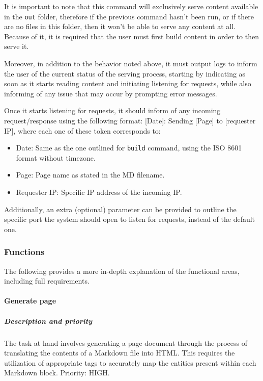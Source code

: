 It is important to note that this command will exclusively serve content
available in the \texttt{out} folder, therefore if the previous command
hasn't been run, or if there are no files in this folder, then it won't
be able to serve any content at all. Because of it, it is required that
the user must first build content in order to then serve it.

Moreover, in addition to the behavior noted above, it must output logs
to inform the user of the current status of the serving process,
starting by indicating as soon as it starts reading content and
initiating listening for requests, while also informing of any issue
that may occur by prompting error messages.

Once it starts listening for requests, it should inform of any incoming
request/response using the following format: {[}Date{]}: Sending
        {[}Page{]} to {[}requester IP{]}, where each one of these token
corresponds to:

\begin{itemize}
    \item
    Date: Same as the one outlined for \texttt{build} command, using the
    ISO 8601 format without timezone.
    \item
    Page: Page name as stated in the MD filename.
    \item
    Requester IP: Specific IP address of the incoming IP.
\end{itemize}

Additionally, an extra (optional) parameter can be provided to outline
the specific port the system should open to listen for requests, instead
of the default one.

\subsubsection{Functions}\label{subsubsec:functions}

The following provides a more in-depth explanation of the functional
areas, including full requirements.

\paragraph{Generate page}\label{par:generate-page}

\subparagraph{Description and priority}\label{subpar:description-and-priority}

The task at hand involves generating a page document through the process
of translating the contents of a Markdown file into HTML. This requires
the utilization of appropriate tags to accurately map the entities
present within each Markdown block. Priority: HIGH.

